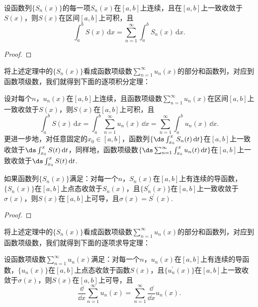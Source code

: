 \begin{theorem}
    设函数列\(\{S_n(x)\}\)的每一项\(S_n(x)\)在\([a,b]\)上连续，且在\([a,b]\)上一致收敛于\(S(x)\)，则\(S(x)\)在区间\([a,b]\)上可积，且\[\int_{a}^{b}S(x)\,\mathrm{d}x = \sum_{n=1}^{\infty}\int_{a}^{b}S_n(x)\,\mathrm{d}x.\]
\end{theorem}
\begin{proof}
    
\end{proof}

将上述定理中的\(\{S_n(x)\}\)看成函数项级数\(\sum\limits_{n=1}^{\infty}u_n(x)\)的部分和函数列，对应到函数项级数，我们就得到下面的{\heiti 逐项积分定理}：
\begin{theorem}[逐项积分定理]
    设对每个\(n\)，\enspace \(u_n(x)\)在\([a,b]\)上连续，且函数项级数\(\sum\limits_{n=1}^{\infty}u_n(x)\)在区间\([a,b]\)上一致收敛于\(S(x)\)，则\(S(x)\)在\([a,b]\)上可积，且\[\int_{a}^{b}S(x)\,\mathrm{d}x = \int_{a}^{b}\sum_{n=1}^{\infty}u_n(x)\,\dd x = \sum_{n=1}^{\infty}\int_{a}^{b}u_n(x)\,\dd x.\]
    更进一步地，对任意固定的\(x_0\in [a,b]\)，函数列\(\{\ds\int_{x_0}^{x}S_n(t)\,\dd t\}\)在\([a,b]\)上一致收敛于\(\ds\int_{x_0}^{x}S(t)\,\dd t\)，同样地，函数项级数\(\{\ds\sum_{n=1}^{\infty}\int_{x_0}^{x}u_n(t)\,\dd t\}\)在\([a,b]\)上一致收敛于\(\ds\int_{x_0}^{x}S(t)\,\dd t\).
\end{theorem}

\begin{theorem}
    如果函数列\(\{S_n(x)\}\)满足：对每一个\(n\)，\enspace \(S_n(x)\)在\([a,b]\)上有连续的导函数，\(\{S_n(x)\}\)在\([a,b]\)上点态收敛于\(S_n(x)\)，且\(\{S_n^{'}(x)\}\)在\([a,b]\)上一致收敛于\(\sigma(x)\)，则\(S(x)\)在\([a,b]\)上可导，且\(\sigma(x) = S^{'}(x)\).
\end{theorem}
\begin{proof}
    
\end{proof}

将上述定理中的\(\{S_n(x)\}\)看成函数项级数\(\sum\limits_{n=1}^{\infty}u_n(x)\)的部分和函数列，对应到函数项级数，我们就得到下面的{\heiti 逐项求导定理}：
\begin{theorem}[逐项求导定理]
    设函数项级数\(\sum\limits_{n=1}^{\infty}u_n(x)\)满足：对每一个\(n\)，\enspace \(u_n(x)\)在\([a,b]\)上有连续的导函数，\(\{u_n(x)\}\)在\([a,b]\)上点态收敛于函数\(S(x)\)，且\(\{u_n^{'}(x)\}\)在\([a,b]\)上一致收敛于\(\sigma(x)\)，则\(S(x)\)在\([a,b]\)上可导，且\[\frac{\dd}{\dd x}\sum_{n=1}^{\infty}u_n(x)=\sum_{n=1}^{\infty}\frac{\dd}{\dd x}u_n(x).\]
\end{theorem}



